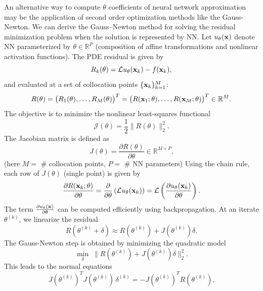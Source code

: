 \documentclass[review]{elsarticle}
\begin{document}
An alternative way to compute $\theta$ coefficients of neural network approximation may be the application of second order optimization methods like the Gauss-Newton.
We can derive the Gauss--Newton method for solving the residual minimization problem when the solution is represented by NN.
Let $u_\theta({\bf x})$ denote NN parameterized by $\theta \in \mathbb{R}^P$
(composition of affine transformations and nonlinear activation functions). 
The PDE residual is given by
\begin{equation}
R_k(\theta) = \mathcal{L} u_\theta({\bf x}_k) - f({\bf x}_k),
\end{equation}
and evaluated at a set of collocation points $\{{\bf x}_k\}_{k=1}^M$:
\begin{equation}
R(\theta) = \big( R_1(\theta), \dots, R_M(\theta) \big)^T=  \big( R({\bf x}_1;\theta), \dots, R({\bf x}_M;\theta) \big)^T \in \mathbb{R}^M.
\end{equation}
The objective is to minimize the nonlinear least-squares functional
\begin{equation}
\mathcal{J}(\theta) = \frac{1}{2} \|R(\theta)\|_2^2.
\end{equation}
The Jacobian matrix is defined as
\begin{equation}
J(\theta) = \frac{\partial R(\theta)}{\partial \theta} \in \mathbb{R}^{M \times P}.
\end{equation}
(here $M=$ \# collocation points, $P=$ \# NN parameters)
Using the chain rule, each row of $J(\theta)$ (single point) is given by
\begin{equation}
\frac{\partial R({\bf x}_k;\theta)}{\partial \theta}
= \frac{\partial}{\partial \theta} \left( \mathcal{L} u_\theta({\bf x}_k) \right)
= \mathcal{L} \left( \frac{\partial u_\theta({\bf x}_k)}{\partial \theta} \right).
\end{equation}
The term $\frac{\partial u_\theta({\bf x})}{\partial \theta}$ can be computed efficiently using backpropagation.
At an iterate $\theta^{(k)}$, we linearize the residual
\begin{equation}
R(\theta^{(k)} + \delta) \approx R(\theta^{(k)}) + J(\theta^{(k)}) \delta.
\end{equation}
The Gauss-Newton step is obtained by minimizing the quadratic model
\begin{equation}
\min_{\delta} \; \| R(\theta^{(k)}) + J(\theta^{(k)}) \delta \|_2^2.
\end{equation}
This leads to the normal equations
\begin{equation}
J(\theta^{(k)})^T J(\theta^{(k)}) \, \delta^{(k)}
= - J(\theta^{(k)})^T R(\theta^{(k)}).
\label{eq:gn_nn}
\end{equation}
\end{document}
